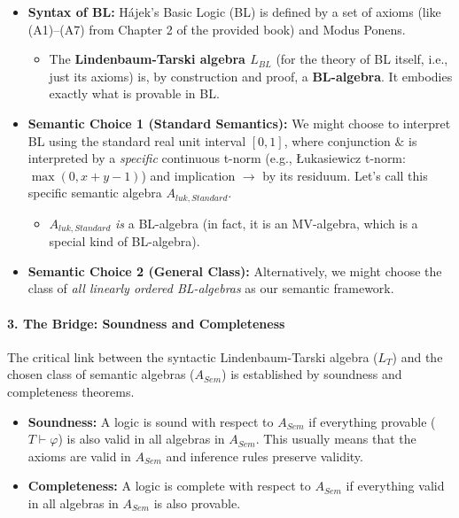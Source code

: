 \begin{itemize}
\item \textbf{Syntax of BL:} Hájek's Basic Logic (BL) is defined by a set of axioms (like (A1)--(A7) from Chapter 2 of the provided book) and Modus Ponens.
\begin{itemize}
\item The \textbf{Lindenbaum-Tarski algebra $L_{BL}$} (for the theory of BL itself, i.e., just its axioms) is, by construction and proof, a \textbf{BL-algebra}. It embodies exactly what is provable in BL.
\end{itemize}
\item \textbf{Semantic Choice 1 (Standard Semantics):} We might choose to interpret BL using the standard real unit interval $[0,1]$, where conjunction $\&$ is interpreted by a \emph{specific} continuous t-norm (e.g., Łukasiewicz t-norm: $\max(0, x+y-1)$) and implication $\to$ by its residuum. Let's call this specific semantic algebra $A_{luk, Standard}$.
\begin{itemize}
\item $A_{luk, Standard}$ \emph{is} a BL-algebra (in fact, it is an MV-algebra, which is a special kind of BL-algebra).
\end{itemize}
\item \textbf{Semantic Choice 2 (General Class):} Alternatively, we might choose the class of \emph{all linearly ordered BL-algebras} as our semantic framework.
\end{itemize}

\paragraph{3. The Bridge: Soundness and Completeness}

The critical link between the syntactic Lindenbaum-Tarski algebra ($L_T$) and the chosen class of semantic algebras ($A_{Sem}$) is established by soundness and completeness theorems.

\begin{itemize}
\item \textbf{Soundness:} A logic is sound with respect to $A_{Sem}$ if everything provable ($T \vdash \varphi$) is also valid in all algebras in $A_{Sem}$. This usually means that the axioms are valid in $A_{Sem}$ and inference rules preserve validity.
\item \textbf{Completeness:} A logic is complete with respect to $A_{Sem}$ if everything valid in all algebras in $A_{Sem}$ is also provable.
\end{itemize}

